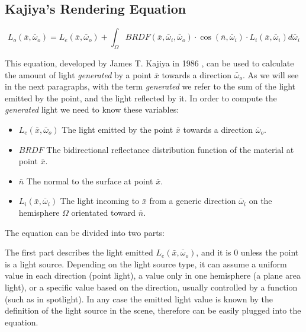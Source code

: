 \documentclass{PoliMi_MasterThesis}
\begin{document}
\subsection{Kajiya's Rendering Equation}
$$
L_o(\bar{x},\bar{\omega}_o) = L_e(\bar{x}, \bar{\omega}_o) + \int_\Omega BRDF(\bar{x}, \bar{\omega}_i, \bar{\omega}_o) \cdot \cos(\bar{n}, \bar{\omega}_i) \cdot L_i(\bar{x}, \bar{\omega}_i) d\bar{\omega}_i
$$

This equation, developed by James T. Kajiya in 1986 \cite{rendering_equation}, can be used to calculate the amount of light \textit{generated} by a point $\bar{x}$ towards a direction $\bar{\omega}_o$. As we will see in the next paragraphs, with the term \textit{generated} we refer to the sum of the light emitted by the point, and the light reflected by it. In order to compute the \textit{generated} light we need to know these variables:
\begin{itemize}
	\item $L_e(\bar{x}, \bar{\omega}_o)$ The light emitted by the point $\bar{x}$ towards a direction $\bar{\omega}_o$.
	\item $BRDF$ The bidirectional reflectance distribution function of the material at point $\bar{x}$.
	\item $\bar{n}$ The normal to the surface at point $\bar{x}$.
	\item $L_i(\bar{x}, \bar{\omega}_i)$ The light incoming to $\bar{x}$ from a generic direction $\bar{\omega}_i$ on the hemisphere $\Omega$ orientated toward $\bar{n}$.
\end{itemize}

The equation can be divided into two parts:

The first part describes the light emitted $L_e(\bar{x}, \bar{\omega}_o)$, and it is 0 unless the point is a light source. Depending on the light source type, it can assume a uniform value in each direction (point light), a value only in one hemisphere (a plane area light), or a specific value based on the direction, usually controlled by a function (such as in spotlight). In any case the emitted light value is known by the definition of the light source in the scene, therefore can be easily plugged into the equation.
\end{document}
